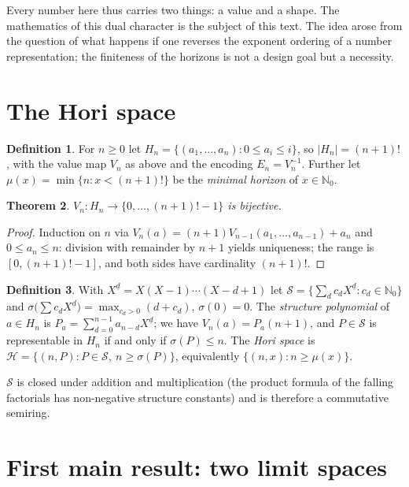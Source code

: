 \documentclass[11pt]{article}
\newtheorem{satz}{Theorem}[section]
\theoremstyle{definition}
\newtheorem{definition}[satz]{Definition}
\theoremstyle{remark}
\newcommand{\Hori}{\mathcal H}
\newcommand{\Struk}{\mathcal S}
\newcommand{\NN}{\mathbb N_0}
\newcommand{\ff}[2]{#1^{\underline{#2}}}
\begin{document}
Every number here thus carries two things: a value and a shape. The
mathematics of this dual character is the subject of this text. The
idea arose from the question of what happens if one reverses the
exponent ordering of a number representation; the finiteness of the
horizons is not a design goal but a necessity.

\section{The Hori space}

\begin{definition}
For $n\ge0$ let $H_n=\{(a_1,\dots,a_n):0\le a_i\le i\}$, so
$|H_n|=(n+1)!$, with the value map $V_n$ as above and the encoding
$E_n=V_n^{-1}$. Further let
$\mu(x)=\min\{n:x<(n+1)!\}$ be the \emph{minimal horizon} of
$x\in\NN$.
\end{definition}

\begin{satz}\label{satz:bij}
$V_n\colon H_n\to\{0,\dots,(n+1)!-1\}$ is bijective.
\end{satz}

\begin{proof}
Induction on $n$ via
$V_n(a)=(n+1)V_{n-1}(a_1,\dots,a_{n-1})+a_n$ and $0\le a_n\le n$:
division with remainder by $n+1$ yields uniqueness; the range is
$[0,(n+1)!-1]$, and both sides have cardinality $(n+1)!$.
\end{proof}

\begin{definition}
With $\ff Xd=X(X-1)\cdots(X-d+1)$ let
$\Struk=\bigl\{\sum_d c_d\ff Xd:c_d\in\NN\bigr\}$ and
$\sigma\bigl(\sum c_d\ff Xd\bigr)=\max_{c_d>0}(d+c_d)$,
$\sigma(0)=0$. The \emph{structure polynomial} of $a\in H_n$ is
$P_a=\sum_{d=0}^{n-1}a_{n-d}\ff Xd$; we have $V_n(a)=P_a(n+1)$, and
$P\in\Struk$ is representable in $H_n$ if and only if
$\sigma(P)\le n$. The \emph{Hori space} is
$\Hori=\{(n,P):P\in\Struk,\ n\ge\sigma(P)\}$, equivalently
$\{(n,x):n\ge\mu(x)\}$.
\end{definition}

$\Struk$ is closed under addition and multiplication (the product
formula of the falling factorials has non-negative structure
constants) and is therefore a commutative semiring.

\section{First main result: two limit spaces}
\end{document}
